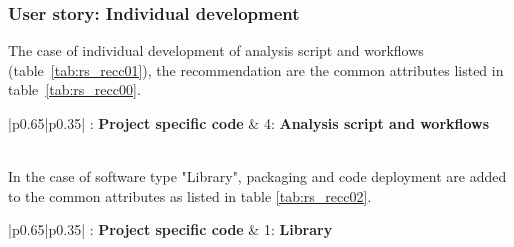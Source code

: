 \subsubsection{User story: Individual development}

The case of individual development of analysis script and workflows (table~\ref{tab:rs_recc01}), the recommendation are the common attributes listed in table~\ref{tab:rs_recc00}.

\begin{center}
    \tabletail{\hline}
    \label{tab:rs_recc01}
    \small
    \begin{supertabular}{|p{0.65\linewidth}|p{0.35\linewidth}|} : \textbf{Project specific code} &
    4: \textbf{Analysis script and workflows} \\ \hline \hline
     \\ \hline

\end{supertabular}
\end{center}

In the case of software type "Library", packaging and code deployment are added to the common attributes as listed in table \ref{tab:rs_recc02}.

\begin{center}
    \tabletail{\hline}
    \label{tab:rs_recc02}
    \small
    \begin{supertabular}{|p{0.65\linewidth}|p{0.35\linewidth}|} : \textbf{Project specific code} &
    1: \textbf{Library} \\ \hline \hline

     \\ \hline
     \\ \hline
     \\ \hline

\end{supertabular}
\end{center}

